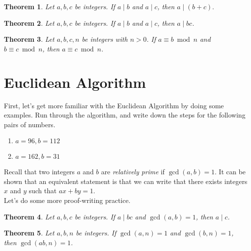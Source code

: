 \documentclass[12pt]{amsart}
\theoremstyle{plain}
\newtheorem{thm}{Theorem}[section]
\theoremstyle{definition}
\begin{document}
\begin{thm}
Let $a, b, c$ be integers.  If $a \mid b$ and $a \mid c$, then $a \mid (b+c).$
\end{thm}

\begin{thm}
Let $a, b, c$ be integers.  If $a \mid b$ and $a \mid c$, then $a \mid bc$.
\end{thm}

\begin{thm}
Let $a, b, c, n$ be integers with $n > 0$.  If $a \equiv b \bmod n$ and $b \equiv c \bmod n$, then $a \equiv c \bmod n$.
\end{thm}

\newpage \section{Euclidean Algorithm}

First, let's get more familiar with the Euclidean Algorithm by doing some examples.  Run through the algorithm, and write down the steps for the following pairs of numbers.

\begin{enumerate}[1.]
	\item $a = 96, b = 112$
	\item $a = 162, b = 31$
\end{enumerate}

Recall that two integers $a$ and $b$ are \emph{relatively prime} if $\gcd(a,b) = 1$.  It can be shown that an equivalent statement is that we can write that there exists integers $x$ and $y$ such that $ax+by = 1$.\\

Let's do some more proof-writing practice.

\begin{thm}
Let $a, b, c$ be integers.  If $a \mid bc$ and $\gcd(a,b) = 1$, then $a \mid c$.
\end{thm}

\begin{thm}
Let $a, b, n$ be integers.  If $\gcd(a,n) = 1$ and $\gcd(b,n) = 1$, then $\gcd(ab,n) = 1$.
\end{thm}
\end{document}
